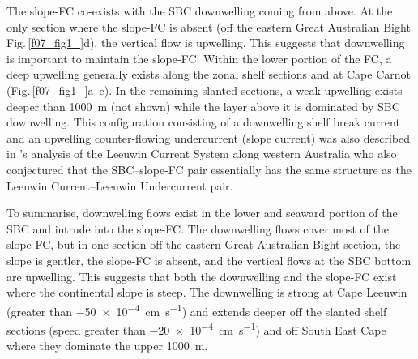 \documentclass[preprint,3p,review,12pt]{elsarticle}
\newcommand{\citepos}[1]{\citeauthor{#1}'s \citeyearpar{#1}}
\begin{document}
The slope-FC co-exists with the SBC downwelling coming from above. At the only section where the slope-FC is absent (off the eastern Great Australian Bight Fig.\,\ref{f07_fig1_}d), the vertical flow is upwelling.
This suggests that downwelling is important to maintain the slope-FC\@.
%
Within the lower portion of the FC, a deep upwelling generally exists along the zonal shelf sections and at Cape Carnot (Fig.\,\ref{f07_fig1_}a--e).
In the remaining slanted sections, a weak upwelling exists deeper than \SI{1000}{\meter} (not shown) while
the layer above it is dominated by SBC downwelling.
%
This configuration consisting of a downwelling shelf break current and an upwelling counter-flowing undercurrent (slope current) was also described in \citepos{Woo2008} analysis of the Leeuwin Current System along western Australia who also conjectured that the SBC--slope-FC pair essentially has the same structure as the Leeuwin Current--Leeuwin Undercurrent pair.

To summarise, downwelling flows exist in the lower and seaward portion of the SBC and intrude into the slope-FC\@.
The downwelling flows cover most of the slope-FC, but 
in one section off the eastern Great Australian Bight section, the slope is gentler, the slope-FC is absent, and the vertical flows at the SBC bottom are upwelling. This suggests that both the downwelling and the slope-FC exist where the continental slope is steep. The downwelling is strong at Cape Leeuwin (greater than \SI{-50 e-4}{\centi\meter\per\second}) and extends deeper off the slanted shelf sections (speed greater than \SI{-20 e-4}{\centi\meter\per\second}) and off South East Cape where they dominate the upper \SI{1000}{\meter}. 
\end{document}
